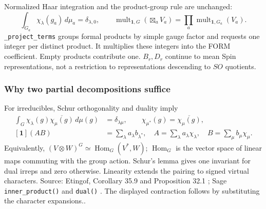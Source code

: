 \documentclass[11pt,a4paper]{article}
\numberwithin{equation}{section}
\newcommand{\code}[1]{{\small\nolinkurl{#1}}}
\newcommand{\src}[1]{{\small\color{muted}Source: #1.}\par}
\begin{document}
Normalized Haar integration and the product-group rule are unchanged:
\begin{equation}
 \int_{G_a}\chi_\lambda(g_a)\,d\mu_a=\delta_{\lambda,0},\qquad
 \operatorname{mult}_{\mathbf1,G}\!\left(\boxtimes_aV_a\right)
 =\prod_a\operatorname{mult}_{\mathbf1,G_a}(V_a).
 \label{eq:haar}
\end{equation}
\code{_project_terms} groups formal products by simple gauge factor and requests
one integer per distinct product. It multiplies these integers into the FORM
coefficient. Empty products contribute one. $B_r,D_r$ continue to mean Spin
representations, not a restriction to representations descending to $SO$ quotients.

\subsubsection{Why two partial decompositions suffice}
For irreducibles, Schur orthogonality and duality imply
\begin{align*}
 \int_G\chi_\lambda(g)\overline{\chi_\mu(g)}\,d\mu(g)&=\delta_{\lambda\mu},\qquad
 \chi_{\mu^*}(g)=\overline{\chi_\mu(g)},\\
 [\mathbf1](AB)&=\sum_\lambda a_\lambda b_{\lambda^*},\quad
 A=\sum_\lambda a_\lambda\chi_\lambda,\quad B=\sum_\mu b_\mu\chi_\mu.
\end{align*}
Equivalently, $(V\otimes W)^G\simeq\operatorname{Hom}_G(V^*,W)$;
$\operatorname{Hom}_G$ is the vector space of linear maps commuting with the group
action. Schur's lemma gives one invariant for dual irreps and zero otherwise.
Linearity extends the pairing to signed virtual characters.
\src{Etingof, Corollary 35.9 and Proposition 32.1 \cite{etingof};
Sage \code{inner_product()} and \code{dual()} \cite{sage-chars}. The displayed
contraction follows by substituting the character expansions.}

\clearpage
\end{document}
